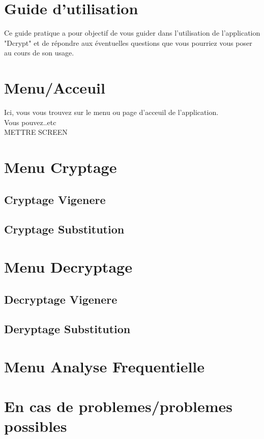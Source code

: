 \documentclass[a4]{article}
\begin{document}
	\section{Guide d'utilisation}
	
	
	Ce guide pratique a pour objectif de vous guider dans l’utilisation de l’application
"Dcrypt" et de répondre aux éventuelles questions que vous pourriez vous poser au
cours de son usage. 
	
	

	\section{Menu/Acceuil}
			Ici, vous vous trouvez sur le menu ou page d'acceuil de l'application. \\
			Vous pouvez..etc \\
			METTRE SCREEN
			
			
			
	\section{Menu Cryptage}
		\subsection{Cryptage Vigenere}
		\subsection{Cryptage Substitution}
		
		
	\section{Menu Decryptage}
		\subsection{Decryptage Vigenere}
		\subsection{Deryptage Substitution}
		
		
	\section{Menu Analyse Frequentielle}
	
	
	\section{En cas de problemes/problemes possibles}
	
	
\end{document}

